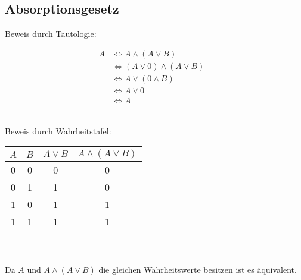 \subsection{Absorptionsgesetz}

Beweis durch Tautologie:

\begin{align*}
A &\Leftrightarrow A \land (A \lor B)\\
  &\Leftrightarrow (A \lor 0) \land (A \lor B)\\
  &\Leftrightarrow A \lor (0 \land B)\\
  &\Leftrightarrow A \lor 0 &\\
  &\Leftrightarrow A  
\end{align*}\

Beweis durch Wahrheitstafel:\\

\begin{tabular}{c|c|c|c}
$A$ & $B$ & $A \lor B$ & $A \land (A \lor B)$\\
\hline
0 & 0 & 0 & 0\\
0 & 1 & 1 & 0\\
1 & 0 & 1 & 1\\
1 & 1 & 1 & 1\\
\end{tabular}\
\\~\\
Da $A$ und $A \land (A \lor B)$ die gleichen Wahrheitswerte besitzen ist es äquivalent.
